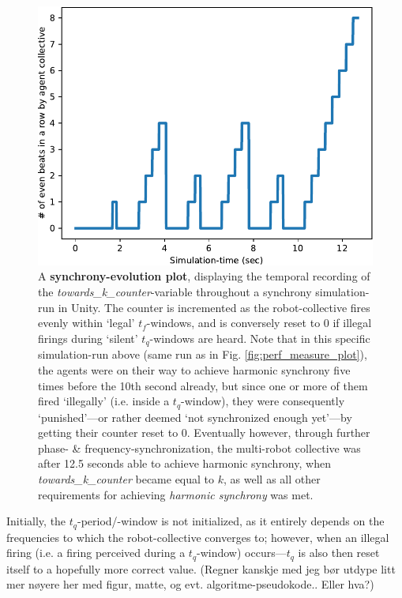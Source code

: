 \begin{figure}[h]
	\centering
	\includegraphics[width=0.85\linewidth]{Assets/Figures/Illustrations/SynchronyEvolutionPerfMeasureIllustration.pdf}
	\caption{A \textbf{synchrony-evolution plot}, displaying the temporal recording of the \textit{towards\_k\_counter}-variable throughout a synchrony simulation-run in Unity. The counter is incremented as the robot-collective fires evenly within `legal' $t_f$-windows, and is conversely reset to 0 if illegal firings during `silent' $t_q$-windows are heard. Note that in this specific simulation-run above (same run as in Fig. \ref{fig:perf_measure_plot}), the agents were on their way to achieve harmonic synchrony five times before the 10th second already, but since one or more of them fired `illegally' (i.e. inside a $t_q$-window), they were consequently `punished'—or rather deemed `not synchronized enough yet'—by getting their counter reset to 0. Eventually however,  through further phase- \& frequency-synchronization, the multi-robot collective was after 12.5 seconds able to achieve harmonic synchrony, when \textit{towards\_k\_counter} became equal to $k$, as well as all other requirements for achieving \textit{harmonic synchrony} was met.}
	\label{fig:synch_evolution_perf_measure_ill}
\end{figure}

Initially, the $t_q$-period/-window is not initialized, as it entirely depends on the frequencies to which the robot-collective converges to; however, when an illegal firing (i.e. a firing perceived during a $t_q$-window) occurs—$t_q$ is also then reset itself to a hopefully more correct value. (Regner kanskje med jeg bør utdype litt mer nøyere her med figur, matte, og evt. algoritme-pseudokode.. Eller hva?)